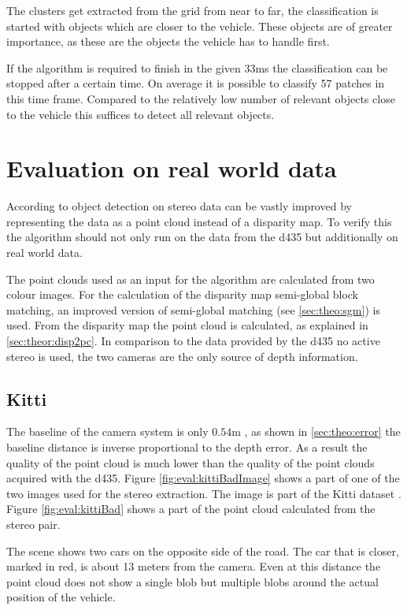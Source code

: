 The clusters get extracted from the grid from near to far, the classification is started with objects which are closer to the vehicle. 
These objects are of greater importance, as these are the objects the vehicle has to handle first.

If the algorithm is required to finish in the given 33ms the classification can be stopped after a certain time. 
On average it is possible to classify 57 patches in this time frame. 
Compared to the relatively low number of relevant objects close to the vehicle this suffices to detect all relevant objects.

\section{Evaluation on real world data}
According to \cite{Wang19} object detection on stereo data can be vastly improved by representing the data as a point cloud instead of a disparity map. 
To verify this the algorithm should not only run on the data from the \ac{d435} but additionally on real world data.

The point clouds used as an input for the algorithm are calculated from two colour images. For the calculation of the disparity map semi-global block matching, an improved version of semi-global matching (see \ref{sec:theo:sgm}) is used.
From the disparity map the point cloud is calculated, as explained in \ref{sec:theor:disp2pc}.
In comparison to the data provided by the \ac{d435} no active stereo is used, the two cameras are the only source of depth information.

\subsection{Kitti}
The baseline of the camera system is only $0.54\si{\m}$ \cite{Menze2015CVPR}, as shown in \ref{sec:theo:error} the baseline distance is inverse proportional to the depth error.
As a result the quality of the point cloud is much lower than the quality of the point clouds acquired with the \ac{d435}. 
Figure \ref{fig:eval:kittiBadImage} shows a part of one of the two images used for the stereo extraction. 
The image is part of the Kitti dataset \cite{Menze2015CVPR}. 
Figure \ref{fig:eval:kittiBad} shows a part of the point cloud calculated from the stereo pair.

The scene shows two cars on the opposite side of the road. 
The car that is closer, marked in red, is about 13 meters from the camera. 
Even at this distance the point cloud does not show a single blob but multiple blobs around the actual position of the vehicle.

